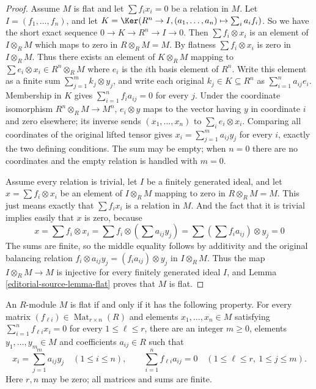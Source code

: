 \begin{proof}
Assume $M$ is flat and let $\sum f_i x_i = 0$ be a relation in $M$.
Let $I = (f_1, \ldots, f_n)$, and let
$K = \Ker(R^n \to I, (a_1, \ldots, a_n) \mapsto \sum_i a_i f_i)$.
So we have the short exact sequence
$0 \to K \to R^n \to I \to 0$. Then $\sum f_i \otimes x_i$
is an element of $I \otimes_R M$ which maps
to zero in $R \otimes_R M = M$. By flatness
$\sum f_i \otimes x_i$ is zero in $I \otimes_R M$.
Thus there exists an element of $K \otimes_R M$ mapping
to $\sum e_i \otimes x_i \in R^n \otimes_R M$ where $e_i$
is the $i$th basis element of $R^n$.
Write this element as a finite sum
$\sum_{j=1}^m k_j\otimes y_j$, and write each original
$k_j\in K\subseteq R^n$ as $\sum_{i=1}^n a_{ij}e_i$.
Membership in $K$ gives $\sum_{i=1}^n f_i a_{ij}=0$
for every $j$. Under the coordinate isomorphism
$R^n\otimes_R M\to M^n$, $e_i\otimes y$ maps to the
vector having $y$ in coordinate $i$ and zero elsewhere;
its inverse sends $(x_1,\ldots,x_n)$ to
$\sum_i e_i\otimes x_i$. Comparing all coordinates of
the original lifted tensor gives
$x_i=\sum_{j=1}^m a_{ij}y_j$ for every $i$, exactly the
two defining conditions. The sum may be empty; when $n=0$
there are no coordinates and the empty relation is handled
with $m=0$.

\medskip\noindent
Assume every relation is trivial, let $I$
be a finitely generated ideal, and let $x = \sum f_i \otimes x_i$
be an element of $I \otimes_R M$ mapping to zero in $R \otimes_R M = M$.
This just means exactly that $\sum f_i x_i$ is a relation in
$M$. And the fact that it is trivial implies easily that
$x$ is zero, because
$$
x
=
\sum f_i \otimes x_i
=
\sum f_i \otimes \left(\sum a_{ij}y_j\right)
=
\sum \left(\sum f_i a_{ij}\right) \otimes y_j
=
0
$$
The sums are finite, so the middle equality follows by
additivity and the original balancing relation
$f_i\otimes a_{ij}y_j=(f_i a_{ij})\otimes y_j$ in
$I\otimes_R M$. Thus the map $I\otimes_R M\to M$ is
injective for every finitely generated ideal $I$, and
Lemma \ref{editorial-source-lemma-flat} proves that $M$ is flat.
\end{proof}

\begin{lemma}
\label{editorial-source-lemma-flat-finite-simultaneous-relations}
An $R$-module $M$ is flat if and only if it has the following
property. For every matrix $(f_{\ell i})\in\operatorname{Mat}_{r\times n}(R)$
and elements $x_1,\ldots,x_n\in M$ satisfying
$\sum_{i=1}^n f_{\ell i}x_i=0$ for every $1\leq\ell\leq r$,
there are an integer $m\geq0$, elements $y_1,\ldots,y_m\in M$
and coefficients $a_{ij}\in R$ such that
$$
x_i=\sum_{j=1}^m a_{ij}y_j\quad(1\leq i\leq n),\qquad
\sum_{i=1}^n f_{\ell i}a_{ij}=0
\quad(1\leq\ell\leq r,\ 1\leq j\leq m).
$$
Here $r,n$ may be zero; all matrices and sums are finite.
\end{lemma}


